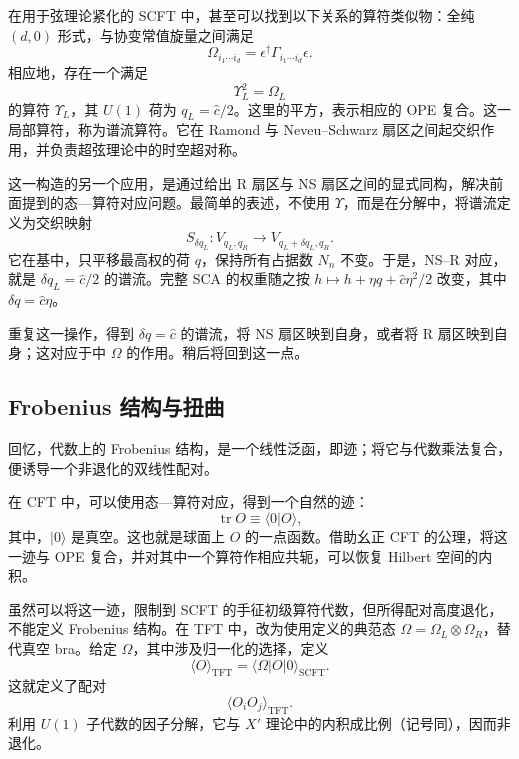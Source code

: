在用于弦理论紧化的 SCFT 中，甚至可以找到以下关系的算符类似物：全纯 $(d,0)$ 形式，与协变常值旋量之间满足
\[
\Omega_{i_1\cdots i_d}
=\epsilon^\dagger\Gamma_{i_1\cdots i_d}\epsilon.
\]
相应地，存在一个满足
\begin{equation}\label{eq:3.105}
\Upsilon_L^2=\Omega_L
\end{equation}
的算符 $\Upsilon_L$，其 $U(1)$ 荷为 $q_L=\widehat c/2$。这里的平方，表示相应的 OPE 复合。这一局部算符，称为谱流算符。它在 Ramond 与 Neveu--Schwarz 扇区之间起交织作用，并负责超弦理论中的时空超对称。

这一构造的另一个应用，是通过给出 R 扇区与 NS 扇区之间的显式同构，解决前面提到的态—算符对应问题。最简单的表述，不使用 $\Upsilon$，而是在分解中，将谱流定义为交织映射
\begin{equation}\label{eq:3.106}
S_{\delta q_L}\colon V_{q_L,q_R}
\longrightarrow V_{q_L+\delta q_L,q_R}.
\end{equation}
它在基中，只平移最高权的荷 $q$，保持所有占据数 $N_n$ 不变。于是，NS--R 对应，就是 $\delta q_L=\widehat c/2$ 的谱流。完整 SCA 的权重随之按 $h\mapsto h+\eta q+\widehat c\eta^2/2$ 改变，其中 $\delta q=\widehat c\eta$。

重复这一操作，得到 $\delta q=\widehat c$ 的谱流，将 NS 扇区映到自身，或者将 R 扇区映到自身；这对应于中 $\Omega$ 的作用。稍后将回到这一点。

\subsection{Frobenius 结构与扭曲}\label{sec:3.3.5}

回忆，代数上的 Frobenius 结构，是一个线性泛函，即迹；将它与代数乘法复合，便诱导一个非退化的双线性配对。

在 CFT 中，可以使用态—算符对应，得到一个自然的迹：
\[
\operatorname{tr}O\equiv\langle0|O\rangle,
\]
其中，$|0\rangle$ 是真空。这也就是球面上 $O$ 的一点函数。借助幺正 CFT 的公理，将这一迹与 OPE 复合，并对其中一个算符作相应共轭，可以恢复 Hilbert 空间的内积。

虽然可以将这一迹，限制到 SCFT 的手征初级算符代数，但所得配对高度退化，不能定义 Frobenius 结构。在 TFT 中，改为使用定义的典范态 $\Omega=\Omega_L\otimes\Omega_R$，替代真空 bra。给定 $\Omega$，其中涉及归一化的选择，定义
\begin{equation}\label{eq:3.107}
\langle O\rangle_{\mathrm{TFT}}
=\langle\Omega|O|0\rangle_{\mathrm{SCFT}}.
\end{equation}
这就定义了配对
\begin{equation}\label{eq:3.108}
\langle O_iO_j\rangle_{\mathrm{TFT}}.
\end{equation}
利用 $U(1)$ 子代数的因子分解，它与 $X'$ 理论中的内积成比例（记号同），因而非退化。

